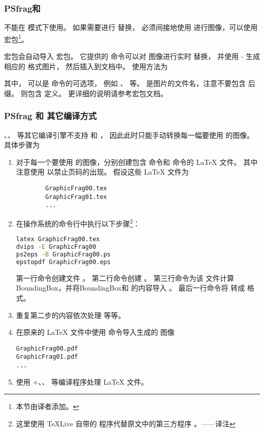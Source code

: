 \subsubsection{PSfrag和 \pdfTeX{}}\label{sssec:psfrag-pdftex}
 不能在 \pdfTeX{} 模式下使用。
如果需要进行  替换，
必须间接地使用  进行图像，可以使用  宏包\footnote{
	本节由译者添加。}。

 宏包会自动导入  宏包。
它提供的  命令可以对  图像进行实时  替换，
并使用 - 生成相应的  格式图片，
然后插入到文档中。
使用方法为
\begin{center}
\end{center}
其中， 可以是  命令的可选项，
例如 、 等。
 是图片的文件名，注意不要包含  后缀。
 则包含  定义。
更详细的说明请参考宏包文档\cite{pstool-doc}。

\subsubsection{PSfrag 和 其它编译方式}\label{sssec:psfrag-otherdriver}
、\XeTeX{}、\LuaTeX{} 等其它编译引擎不支持  和 ，
因此此时只能手动转换每一幅要使用  的图像。
具体步骤为
\begin{enumerate}
	\item 对于每一个要使用  的图像，分别创建包含  命令和  命令的 \LaTeX{} 文件。
	其中注意使用  以禁止页码的出现。
	假设这些 \LaTeX{} 文件为
\begin{verbatim}
		GraphicFrag00.tex
		GraphicFrag01.tex
		...
\end{verbatim}
	\item 在操作系统的命令行中执行以下步骤\footnote{
		这里使用 \TeX Live 自带的  程序代替原文中的第三方程序 。——译注}：
\begin{lstlisting}[language=bash]
latex GraphicFrag00.tex
dvips -E GraphicFrag00
ps2eps -B GraphicFrag00.ps
epstopdf GraphicFrag00.eps
\end{lstlisting}
	第一行命令创建文件 。
	第二行命令创建 。
	第三行命令为该  文件计算 BoundingBox，并将BoundingBox和  的内容导入 。
	最后一行命令将  转成  格式。
	\item 重复第二步的内容依次处理  等等。
	\item 在原来的 \LaTeX{} 文件中使用  命令导入生成的  图像
\begin{verbatim}
GraphicFrag00.pdf
GraphicFrag01.pdf
...
\end{verbatim}
	\item 使用 +、、 等编译程序处理 \LaTeX{} 文件。
\end{enumerate}


